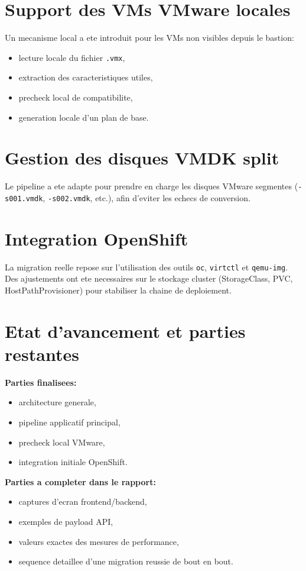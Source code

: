 \section{Support des VMs VMware locales}
Un mecanisme local a ete introduit pour les VMs non visibles depuis le bastion:
\begin{itemize}[leftmargin=1.2cm]
  \item lecture locale du fichier \texttt{.vmx},
  \item extraction des caracteristiques utiles,
  \item precheck local de compatibilite,
  \item generation locale d'un plan de base.
\end{itemize}

\section{Gestion des disques VMDK split}
Le pipeline a ete adapte pour prendre en charge les disques VMware segmentes
(\texttt{-s001.vmdk}, \texttt{-s002.vmdk}, etc.), afin d'eviter les echecs de conversion.

\section{Integration OpenShift}
La migration reelle repose sur l'utilisation des outils \texttt{oc}, \texttt{virtctl} et \texttt{qemu-img}.
Des ajustements ont ete necessaires sur le stockage cluster (StorageClass, PVC, HostPathProvisioner) pour stabiliser la chaine de deploiement.

\section{Etat d'avancement et parties restantes}
\textbf{Parties finalisees:}
\begin{itemize}[leftmargin=1.2cm]
  \item architecture generale,
  \item pipeline applicatif principal,
  \item precheck local VMware,
  \item integration initiale OpenShift.
\end{itemize}

\textbf{Parties a completer dans le rapport:}
\begin{itemize}[leftmargin=1.2cm]
  \item captures d'ecran frontend/backend,
  \item exemples de payload API,
  \item valeurs exactes des mesures de performance,
  \item sequence detaillee d'une migration reussie de bout en bout.
\end{itemize}
